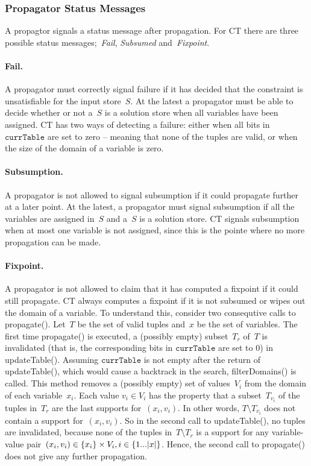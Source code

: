 \documentclass[a4paper,11pt]{article}
\newcommand{\CurrTable}{\texttt{currTable}}
\begin{document}

\subsubsection{Propagator Status Messages}
A propagtor signals a status message after propagation.
For CT there are three possible status messages;~\emph{Fail},
\emph{Subsumed} and~\emph{Fixpoint}.

\paragraph{Fail.}
A propagator must correctly signal failure
if it has decided that the constraint is unsatisfiable for the input store~$S$. At the latest a propagator must be
able to decide whether or not a~$S$ is a solution store when all
variables have been assigned.
CT has two ways of detecting a failure: either when all bits in~$\CurrTable$
are set to zero -- meaning that none of the tuples are valid, or when the
size of the domain of a variable is zero.

\paragraph{Subsumption.}
A propagator is not allowed to signal subsumption if it could propagate further
at a later point. At the latest, a propagator must signal subsumption if all the variables
are assigned in~$S$ and a~$S$ is a solution store.
CT signals subsumption when at most one variable is not assigned,
since this is the pointe where no more propagation can be made.

\paragraph{Fixpoint.}
A propagator is not allowed to claim that it has computed a fixpoint if
it could still propagate.
CT always computes a fixpoint if it is not subsumed or wipes out the domain of a variable.
To understand this, consider two consequtive calls to propagate().
Let~$T$ be the set of valid tuples and~$x$ be the set of variables.
The first time propagate() is executed, a (possibly empty) subset~$T_r$ of~$T$
is invalidated (that is, the corresponding bits in $\CurrTable$ are set to $0$)
in updateTable().
Assuming $\CurrTable$ is not empty after the return of updateTable(), which would
cause a backtrack in the search, filterDomains() is called.
This method removes a (possibly empty) set of values~$V_i$ from the domain 
of each variable~$x_i$.
Each value $v_i \in V_i$ has the property that a subset~$T_{v_i}$ 
of the tuples in~$T_r$ are the last supports for~$(x_i,v_i)$. In other words,
$T \setminus T_{v_i}$ does not contain a support for~$(x_i,v_i)$.
So in the second call to updateTable(), no tuples are invalidated,
because none of the tuples in~$T \setminus T_r$ is a support for any variable-value
pair~$(x_i, v_i) \in \left\{x_i\right\} \times V_i, i \in \left\{1...|x|\right\}$.
Hence, the second call to propagate() does not give
any further propagation.
\end{document}
